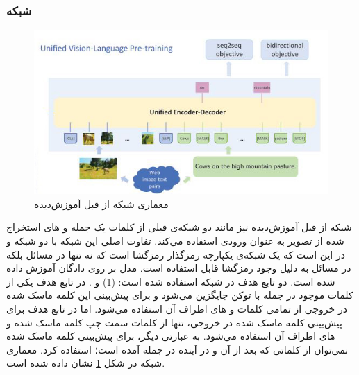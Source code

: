 \subsubsection{  شبکه }
	\begin{figure}
		\centerline{\includegraphics[scale=0.7]{images/VLP.JPG}}
		\caption[معماری شبکه از قبل آموزش‌دیده]{معماری شبکه از قبل آموزش‌دیده\cite{zhou2020unified}}
		\label{fig:VLP}
	\end{figure}
	
	شبکه از قبل آموزش‌دیده
	نیز مانند دو شبکه‌ی قبلی از کلمات یک جمله و
	های استخراج شده از تصویر به عنوان ورودی استفاده می‌کند. تفاوت اصلی این شبکه با دو شبکه
	و 
	در این است که یک شبکه‌ی یکپارچه رمزگذار-رمزگشا است که نه تنها در مسائل 
	بلکه در مسائل
	به دلیل وجود رمزگشا قابل استفاده است. مدل 
	بر روی ‌دادگان
	آموزش داده شده است. دو تابع هدف در شبکه
	استفاده شده است: (1) 
	و 
	.
	در تابع هدف
	یکی از کلمات موجود در جمله با توکن 
	\lr{[MASK]}
	جایگزین می‌شود و برای پیش‌بینی این کلمه ماسک شده در خروجی از تمامی کلمات و 
	های اطراف آن استفاده می‌شود. اما در تابع هدف 
	برای پیش‌بینی کلمه ماسک شده در خروجی، تنها از کلمات سمت چپ کلمه ماسک شده و 
	های اطراف آن استفاده می‌شود. به عبارتی دیگر، برای پیش‌بینی کلمه ماسک شده نمی‌توان از کلماتی که بعد از  آن و در آینده در جمله آمده است؛ استفاده کرد. معماری شبکه 
	در شکل 
	\ref{fig:VLP}
	نشان داده شده است.
